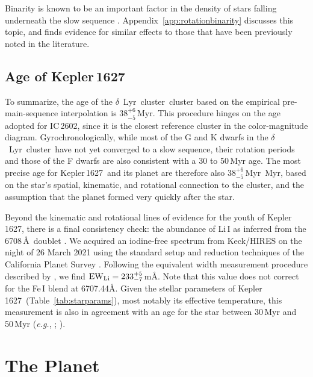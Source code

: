 \documentclass[12pt,modern,twocolumn,tighten]{aastex63}
\newcommand{\cn}{$\delta$\ Lyr\ cluster} %
\newcommand{\sn}{Kepler\,1627} %
\newcommand{\clusterage}{$38^{+6}_{-5}$\,Myr} %
\begin{document}
Binarity is known to be an important factor in the density of stars
falling underneath the slow sequence
\citep{meibom_effect_2007,gillen_ngts_2020,bouma_2021_ngc2516}.
Appendix~\ref{app:rotationbinarity} discusses this topic, and finds
evidence for similar effects to those that have been previously
noted in the literature.

\subsection{Age of Kepler\,1627}

To summarize, the age of the \cn\ cluster based on the empirical
pre-main-sequence interpolation is \clusterage.  This procedure hinges
on the age adopted for IC\,2602, since it is the closest reference
cluster in the color-magnitude diagram.  Gyrochronologically, while
most of the G and K dwarfs in the \cn\ have not yet converged to a
slow sequence, their rotation periods and those of the F dwarfs are
also consistent with a 30 to 50\,Myr age. The most precise age for
\sn\ and its planet are therefore also \clusterage\ Myr, based on the
star's spatial, kinematic, and rotational connection to the cluster,
and the assumption that the planet formed very quickly after the star.

Beyond the kinematic and rotational lines of evidence for the youth of
\sn, there is a final consistency check: the abundance of
Li\,\textsc{I} as inferred from the 6708\,\AA\ doublet
\citep[see {\it e.g.},][]{soderblom_ages_2014}.
We acquired an iodine-free spectrum from
Keck/HIRES on the night of 26 March 2021 using the standard setup and
reduction techniques of the California Planet Survey
\citep{howard_cps_2010}.  Following the equivalent width measurement
procedure described by \citet{bouma_2021_ngc2516}, we find ${\rm
EW}_{\rm Li} = 233^{+5}_{-7}$\,m\AA.   Note that this value does not
correct for the Fe\,\textsc{I} blend at 6707.44\AA.  Given the stellar
parameters of \sn\ (Table~\ref{tab:starparams}), most notably its
effective temperature, this measurement is also in agreement with an
age for the star between 30\,Myr and 50\,Myr ({\it e.g.}, 
\citealt{randich_gaiaeso_2018}; \citealt{bouma_2021_ngc2516}).


\section{The Planet}
\label{sec:planet}
\end{document}
